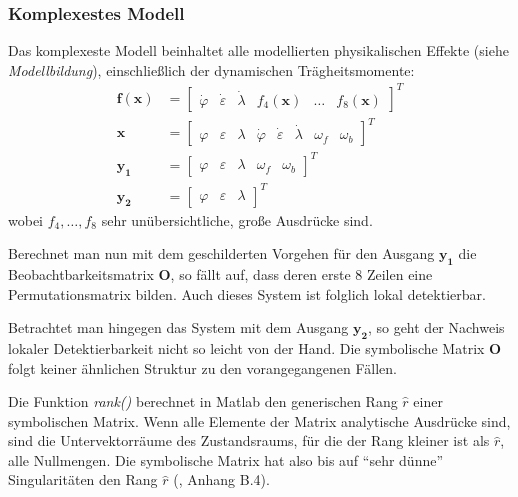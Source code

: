 \documentclass[10pt,twocolumn]{article}
\begin{document}
	\subsubsection{Komplexestes Modell}
	Das komplexeste Modell beinhaltet alle modellierten physikalischen Effekte (siehe \textit{Modellbildung}), einschließlich der dynamischen Trägheitsmomente:
	\begin{align*}
	\bm f(\bm x) &= \begin{bmatrix}
	\dot \varphi &
	\dot \varepsilon &
	\dot \lambda  &
	f_4(\bm x) &
	\ldots &
	f_8(\bm x)
	\end{bmatrix}^T\\
	\bm x &= \begin{bmatrix}
	\varphi & \varepsilon & \lambda & \dot \varphi & \dot \varepsilon & \dot \lambda & \omega_f & \omega_b
	\end{bmatrix}^T \\ 
	\bm {y_1} &= \begin{bmatrix}
	\varphi & \varepsilon & \lambda & \omega_f & \omega_b
	\end{bmatrix}^T \\
	\bm {y_2} &= \begin{bmatrix}
	\varphi & \varepsilon & \lambda 
	\end{bmatrix}^T
\end{align*}
	wobei $f_4, \ldots, f_8$ sehr unübersichtliche, große Ausdrücke sind.

	Berechnet man nun mit dem geschilderten Vorgehen für den Ausgang $\bm{y_1}$
	die Beobachtbarkeitsmatrix $\bm O$, so fällt auf, dass deren erste 8 Zeilen eine Permutationsmatrix bilden.
	Auch dieses System ist folglich lokal detektierbar.

	Betrachtet man hingegen das System mit dem Ausgang $\bm{y_2}$, so geht der Nachweis lokaler Detektierbarkeit nicht so leicht von der Hand. 
	Die symbolische Matrix $\bm O$ folgt keiner ähnlichen Struktur zu den vorangegangenen Fällen.

	Die Funktion \textit{rank()} berechnet in Matlab den generischen Rang $\hat r$ einer symbolischen Matrix. Wenn alle Elemente der Matrix analytische Ausdrücke sind, sind die Untervektorräume des Zustandsraums, für die der Rang kleiner ist als $\hat r$, alle Nullmengen. Die symbolische Matrix hat also bis auf \enquote{sehr dünne} Singularitäten den Rang $\hat r$ (\cite{ex3}, Anhang B.4).
\end{document}
